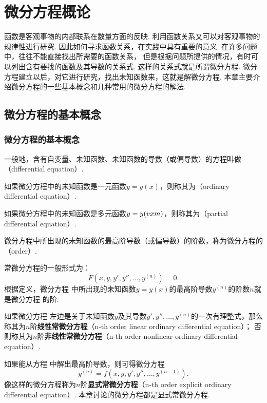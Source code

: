 \chapter{微分方程概论}
函数是客观事物的内部联系在数量方面的反映.
利用函数关系又可以对客观事物的规律性进行研究.
因此如何寻求函数关系，在实践中具有重要的意义.
在许多问题中，往往不能直接找出所需要的函数关系，%
但是根据问题所提供的情况，有时可以列出含有要找的函数及其导数的关系式.
这样的关系式就是所谓微分方程.
微分方程建立以后，对它进行研究，找出未知函数来，这就是解微分方程.
本章主要介绍微分方程的一些基本概念和几种常用的微分方程的解法.

\section{微分方程的基本概念}
\subsection{微分方程的基本概念}
\begin{definition}
一般地，含有自变量、未知函数、未知函数的导数（或偏导数）的方程叫做（differential equation）.

如果微分方程中的未知函数是一元函数\(y = y(x)\)，则称其为（ordinary differential equation）.

如果微分方程中的未知函数是多元函数\(y = y(v{x}{m})\)，则称其为（partial differential equation）.

微分方程中所出现的未知函数的最高阶导数（或偏导数）的阶数，称为微分方程的（order）.
\end{definition}

常微分方程的一般形式为：
\begin{equation}\label{equation:微分方程.微分方程的一般形式}
F\left( x,y,y',y'',\dotsc,y^{(n)} \right)=0.
\end{equation}
根据定义，微分方程  中所出现的未知函数\(y = y(x)\)的最高阶导数\(y^{(n)}\)的阶数\(n\)就是微分方程  的阶.

如果微分方程  左边是关于未知函数\(y\)及其导数\(y',y'',\dotsc,y^{(n)}\)的一次有理整式，那么称其为\(n\)阶\textbf{线性常微分方程}（n-th order linear ordinary differential equation）；
否则称其为\(n\)阶\textbf{非线性常微分方程}（n-th order nonlinear ordinary differential equation）.

如果能从方程  中解出最高阶导数，则可得微分方程
\begin{equation}\label{equation:微分方程.分离出最高阶导数}
y^{(n)} = f\left( x,y,y',y'',\dotsc,y^{(n-1)} \right).
\end{equation}
像这样的微分方程称为\(n\)阶\textbf{显式常微分方程}（n-th order explicit ordinary differential equation）.
本章讨论的微分方程都是显式常微分方程.

